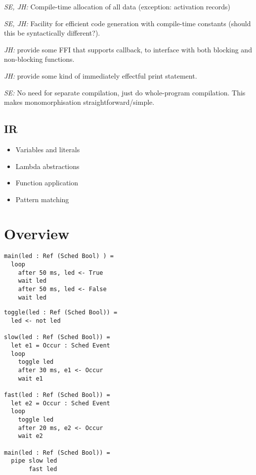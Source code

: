 \documentclass{article}
\begin{document}
\textit{SE, JH:} Compile-time allocation of all data (exception: activation records)

\textit{SE, JH:} Facility for efficient code generation with compile-time
constants (should this be syntactically different?).

\textit{JH:} provide some FFI that supports callback, to interface with both
blocking and non-blocking functions.

\textit{JH:} provide some kind of immediately effectful print statement.

\textit{SE:} No need for separate compilation, just do whole-program
compilation. This makes monomorphisation straightforward/simple.

\subsection{IR}

\begin{itemize}
\item Variables and literals
\item Lambda abstractions
\item Function application
\item Pattern matching
\end{itemize}

\section{Overview}

\begin{lstlisting}
main(led : Ref (Sched Bool) ) =
  loop
    after 50 ms, led <- True
    wait led
    after 50 ms, led <- False
    wait led
\end{lstlisting}

\begin{lstlisting}
toggle(led : Ref (Sched Bool)) =
  led <- not led

slow(led : Ref (Sched Bool)) =
  let e1 = Occur : Sched Event
  loop
    toggle led
    after 30 ms, e1 <- Occur
    wait e1

fast(led : Ref (Sched Bool)) =
  let e2 = Occur : Sched Event
  loop
    toggle led
    after 20 ms, e2 <- Occur
    wait e2
    
main(led : Ref (Sched Bool)) =
  pipe slow led
       fast led
\end{lstlisting}
\end{document}
